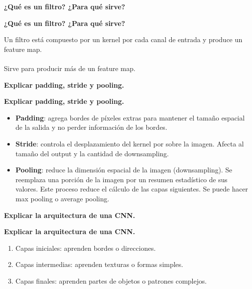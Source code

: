 \documentclass[10pt]{memoir}
\begin{document}
\clearpage
\begin{center}
	\textbf{\Large ¿Qué es un filtro? ¿Para qué sirve?}
\end{center}

\clearpage
\begin{center}
	\textbf{\Large ¿Qué es un filtro? ¿Para qué sirve?}
\end{center}
\noindent Un filtro está compuesto por un kernel por cada canal de entrada y produce un feature map. \\
\\
\noindent Sirve para producir más de un feature map.

\clearpage
\begin{center}
	\textbf{\Large Explicar padding, stride y pooling.}
\end{center}

\clearpage
\begin{center}
	\textbf{\Large Explicar padding, stride y pooling.}
\end{center}
\begin{itemize}
	\item \textbf{Padding}: agrega bordes de píxeles extras para mantener el tamaño espacial de la salida y no perder información de los bordes.
	\item \textbf{Stride}: controla el desplazamiento del kernel por sobre la imagen. Afecta al tamaño del output y la cantidad de downsampling.
	\item \textbf{Pooling}: reduce la dimensión espacial de la imagen (downsampling). Se reemplaza una porción de la imagen por un resumen estadístico de sus valores. Este proceso reduce el cálculo de las capas siguientes. Se puede hacer max pooling o average pooling.
\end{itemize}

\clearpage
\begin{center}
	\textbf{\Large Explicar la arquitectura de una CNN.}
\end{center}

\clearpage
\begin{center}
	\textbf{\Large Explicar la arquitectura de una CNN.}
\end{center}
\begin{enumerate}
	\item Capas iniciales: aprenden bordes o direcciones.
	\item Capas intermedias: aprenden texturas o formas simples.
	\item Capas finales: aprenden partes de objetos o patrones complejos.
\end{enumerate}
\end{document}
